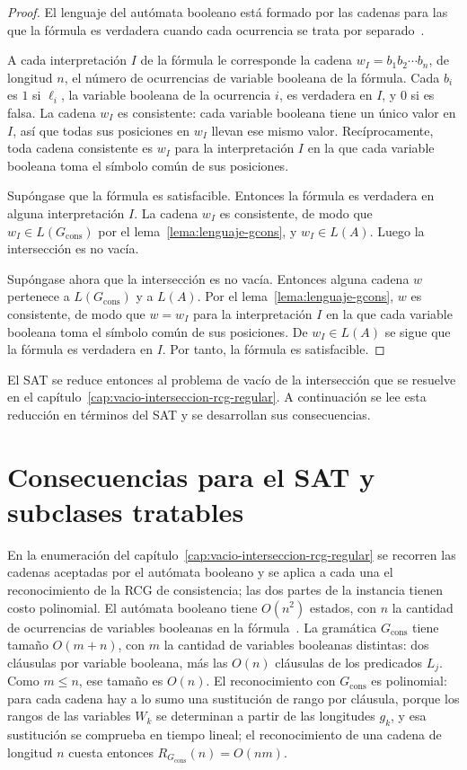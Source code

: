 \begin{proof}
El lenguaje del autómata booleano está formado por las cadenas para
las que la fórmula es verdadera cuando cada ocurrencia se trata por
separado~\cite{fernandezarias2007}.

A cada interpretación $I$ de la fórmula le corresponde la cadena
$w_I = b_1 b_2 \cdots b_n$, de longitud $n$, el número de ocurrencias
de variable booleana de la fórmula. Cada $b_i$ es $1$ si $\ell_i$, la variable booleana de la ocurrencia
$i$, es verdadera en $I$, y $0$ si es falsa. La cadena $w_I$ es consistente: cada variable booleana tiene un único
valor en $I$, así que todas sus posiciones en $w_I$ llevan ese mismo
valor. Recíprocamente, toda cadena consistente es $w_I$ para la
interpretación $I$ en la que cada variable booleana toma el símbolo
común de sus posiciones.

Supóngase que la fórmula es satisfacible. Entonces la fórmula es
verdadera en alguna interpretación $I$. La cadena $w_I$ es consistente,
de modo que $w_I \in L(G_{\mathrm{cons}})$ por el
lema~\ref{lema:lenguaje-gcons}, y $w_I \in L(A)$. Luego la
intersección es no vacía.

Supóngase ahora que la intersección es no vacía. Entonces alguna
cadena $w$ pertenece a $L(G_{\mathrm{cons}})$ y a $L(A)$. Por el
lema~\ref{lema:lenguaje-gcons}, $w$ es consistente, de modo que
$w = w_I$ para la interpretación $I$ en la que cada variable booleana
toma el símbolo común de sus posiciones. De $w_I \in L(A)$ se sigue que
la fórmula es verdadera en $I$. Por tanto, la fórmula es satisfacible.
\end{proof}

El SAT se reduce entonces al problema de vacío de la intersección que
se resuelve en el capítulo~\ref{cap:vacio-interseccion-rcg-regular}. A
continuación se lee esta reducción en términos del SAT y se desarrollan
sus consecuencias.

\section{Consecuencias para el SAT y subclases tratables}
\label{sec:lectura-sat}

En la enumeración del capítulo~\ref{cap:vacio-interseccion-rcg-regular}
se recorren las cadenas aceptadas por el autómata booleano y se aplica
a cada una el reconocimiento de la RCG de consistencia; las dos partes
de la instancia tienen costo polinomial. El autómata booleano tiene
$O(n^2)$ estados, con $n$ la cantidad de
ocurrencias de variables booleanas en la fórmula~\cite{fernandezarias2007}. La gramática
$G_{\mathrm{cons}}$ tiene tamaño $O(m + n)$, con $m$ la cantidad de
variables booleanas distintas: dos cláusulas por variable booleana, más
las $O(n)$ cláusulas de los predicados $L_j$. Como $m \le n$, ese tamaño
es $O(n)$. El reconocimiento con
$G_{\mathrm{cons}}$ es polinomial: para cada cadena hay a lo sumo una
sustitución de rango por cláusula, porque los rangos de las variables
$W_k$ se determinan a partir de las longitudes $g_k$, y esa sustitución
se comprueba
en tiempo lineal; el reconocimiento de una cadena de longitud $n$
cuesta entonces $R_{G_{\mathrm{cons}}}(n) = O(nm)$.

